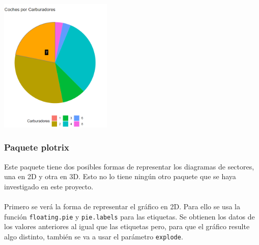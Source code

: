 \documentclass{article}\usepackage[]{graphicx}\usepackage[]{color}
\begin{document}
\vbox{
    \centering
    \includegraphics[width=0.4\textwidth]{imag/pie_ggplot2}
}
\clearpage
\subsubsection{Paquete plotrix}
Este paquete %
tiene dos posibles formas de representar los diagramas de sectores, una en 2D y otra en 3D. Esto no lo tiene ning\'un otro paquete que se haya investigado en este proyecto.~\\~\\
Primero se ver\'a la forma de representar el gr\'afico en 2D. Para ello se usa la funci\'on \texttt{floating.pie} y \texttt{pie.labels} para las etiquetas. Se obtienen los datos de los valores anteriores al igual que las etiquetas pero, para que el gr\'afico resulte algo distinto, tambi\'en se va a usar el par\'ametro \texttt{explode}.
\end{document}

